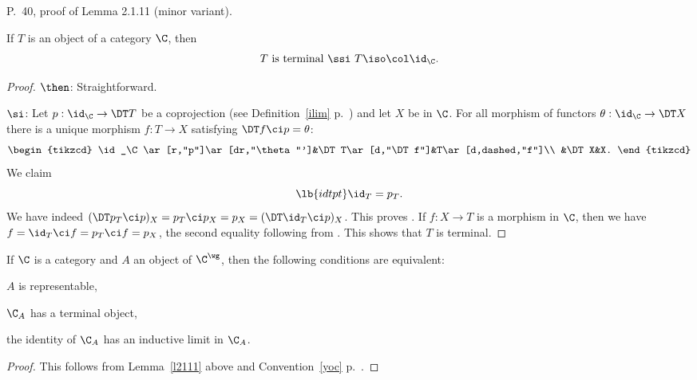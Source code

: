 \documentclass[12pt]{article}
\theoremstyle{remark}
\theoremstyle{definition}
\begin{document}
\begin{s} 
P.~40, proof of Lemma 2.1.11 (minor variant).

\begin{lem}
If $T$ is an object of a category $\C$, then 
$$
T\text{ is terminal }\ssi\ T\iso\col\id_\C.
$$
\end{lem}

\begin{proof} $\then$: Straightforward.

\nn$\si$: Let $p:\id_\C\to\DT T$ be a coprojection (see Definition~\ref{ilim} p.~) and let $X$ be in $\C$. For all morphism of functors $\theta:\id_\C\to\DT X$ there is a unique morphism $f:T\to X$ satisfying $\DT f\ci p=\theta$: %
$$
\begin{tikzcd}
\id_\C\ar[r,"p"]\ar[dr,"\theta"']&\DT T\ar[d,"\DT f"]&T\ar[d,dashed,"f"]\\ 
&\DT X&X.
\end{tikzcd}
$$ 
We claim 
\begin{equation}\lb{idtpt}
\id_T=p_T.
\end{equation} 
We have indeed $(\DT p_T\ci p)_X=p_T\ci p_X=p_X=(\DT\id_T\ci p)_X$. This proves . If $f:X\to T$ is a morphism in $\C$, then we have $f=\id_T\ci f=p_T\ci f=p_X$, the second equality following from . This shows that $T$ is terminal.
\end{proof}

\begin{cor}
If $\C$ is a category and $A$ an object of $\C^\wg$, then the following conditions are equivalent:

 $A$ is representable,

 $\C_A$ has a terminal object,

 the identity of $\C_A$ has an inductive limit in $\C_A$.
\end{cor}

\begin{proof}
This follows from Lemma~\ref{l2111} above and Convention~\ref{yoc} p.~.
\end{proof}
\end{s}

%
\end{document}
